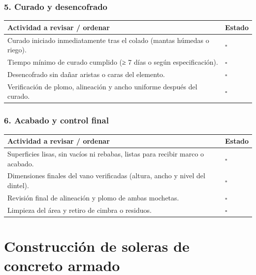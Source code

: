 \documentclass[12pt]{article}
\newcommand{\cbox}{\(\square\)} %
\begin{document}
	\subsubsection*{5. Curado y desencofrado}
	\begin{tabularx}{\linewidth}{>{\raggedright\arraybackslash}p{0.93\linewidth} >{\centering\arraybackslash}m{0.07\linewidth}}
		\toprule
		\textbf{Actividad a revisar / ordenar} & \textbf{Estado}\\
		\midrule
		Curado iniciado inmediatamente tras el colado (mantas húmedas o riego). & \cbox \\
		Tiempo mínimo de curado cumplido (≥ 7 días o según especificación). & \cbox \\
		Desencofrado sin dañar aristas o caras del elemento. & \cbox \\
		Verificación de plomo, alineación y ancho uniforme después del curado. & \cbox \\
		\bottomrule
	\end{tabularx}
	
	\subsubsection*{6. Acabado y control final}
	\begin{tabularx}{\linewidth}{>{\raggedright\arraybackslash}p{0.93\linewidth} >{\centering\arraybackslash}m{0.07\linewidth}}
		\toprule
		\textbf{Actividad a revisar / ordenar} & \textbf{Estado}\\
		\midrule
		Superficies lisas, sin vacíos ni rebabas, listas para recibir marco o acabado. & \cbox \\
		Dimensiones finales del vano verificadas (altura, ancho y nivel del dintel). & \cbox \\
		Revisión final de alineación y plomo de ambas mochetas. & \cbox \\
		Limpieza del área y retiro de cimbra o residuos. & \cbox \\
		\bottomrule
	\end{tabularx}
	
	
	
	
	
	
	
	
	
	
	
	
	
	
	
	\section{Construcción de soleras de concreto armado}
	
\end{document}
